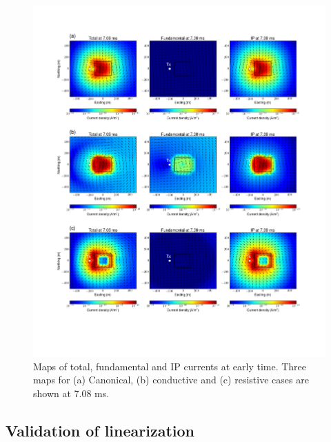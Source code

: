 \documentclass[a4paper, 11pt]{article}
\begin{document}
\begin{figure}[htb]
  \centering  \includegraphics[width=1.0\textwidth]{figures/threecasesresp/IPcurrents_ch38.png}
  \caption{Maps of total, fundamental and IP currents at early time. Three maps for  (a) Canonical, (b) conductive and (c) resistive cases are shown at 7.08 ms.}
  \label{F:IPcurrents2}
\end{figure}

\subsection{Validation of linearization}
\end{document}
